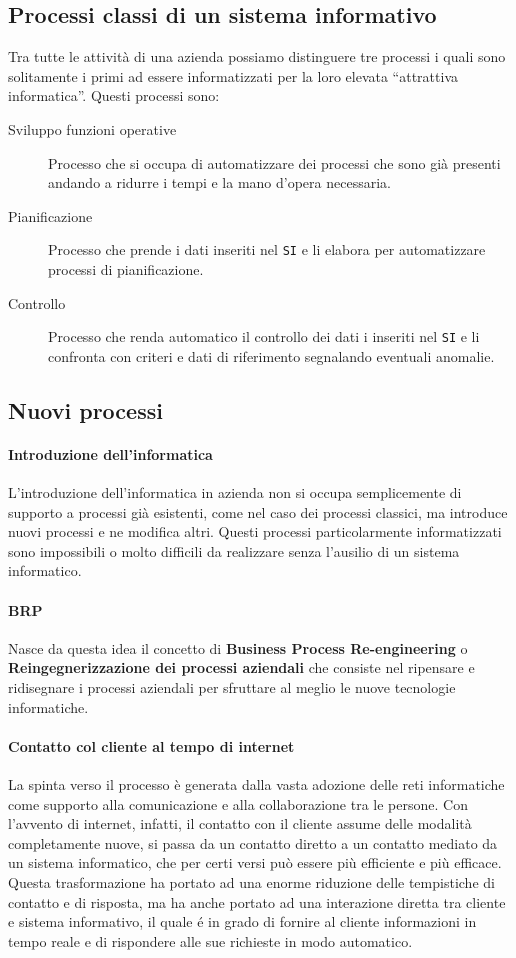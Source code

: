     \subsection{Processi classi di un sistema informativo}
        Tra tutte le attività di una azienda possiamo distinguere tre processi i quali sono solitamente i primi ad essere informatizzati per la loro elevata ``attrattiva informatica''. Questi processi sono:
        \begin{description}
            \item[Sviluppo funzioni operative] Processo che si occupa di automatizzare dei processi che sono già presenti andando a ridurre i tempi e la mano d'opera necessaria.
            \item[Pianificazione] Processo che prende i dati inseriti nel \texttt{SI} e li elabora per automatizzare processi di pianificazione.
            \item[Controllo] Processo che renda automatico il controllo dei dati i inseriti nel \texttt{SI} e li confronta con criteri e dati di riferimento segnalando eventuali anomalie.
        \end{description}
    \subsection{Nuovi processi}
        \label{subsec:nuoviProcessi}
        
        \paragraph{Introduzione dell'informatica} L'introduzione dell'informatica in azienda non si occupa semplicemente di supporto a processi già esistenti, come nel caso dei processi classici, ma introduce nuovi processi e ne modifica altri. Questi processi particolarmente informatizzati sono impossibili o molto difficili da realizzare senza l'ausilio di un sistema informatico.
        \paragraph{BRP} Nasce da questa idea il concetto di \textbf{Business Process Re-engineering} o \textbf{Reingegnerizzazione dei processi aziendali} che consiste nel ripensare e ridisegnare i processi aziendali per sfruttare al meglio le nuove tecnologie informatiche. 
        \paragraph{Contatto col cliente al tempo di internet} La spinta verso il processo è generata dalla vasta adozione delle reti informatiche come supporto alla comunicazione e alla collaborazione tra le persone. Con l'avvento di internet, infatti, il contatto con il cliente assume delle modalità completamente nuove, si passa da un contatto diretto a un contatto mediato da un sistema informatico, che per certi versi può essere più efficiente e più efficace. Questa trasformazione ha portato ad una enorme riduzione delle tempistiche di contatto e di risposta, ma ha anche portato ad una interazione diretta tra cliente e sistema informativo, il quale é in grado di fornire al cliente informazioni in tempo reale e di rispondere alle sue richieste in modo automatico.
